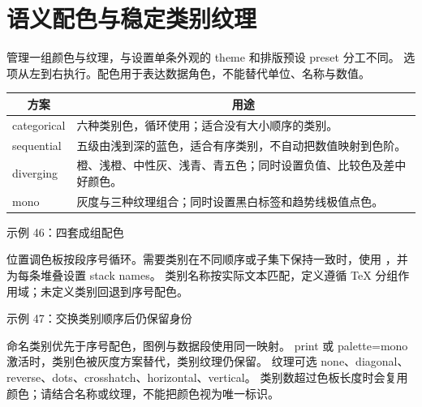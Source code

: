 \section{语义配色与稳定类别纹理}
 管理一组颜色与纹理，与设置单条外观的 theme 和排版预设 preset 分工不同。
选项从左到右执行。配色用于表达数据角色，不能替代单位、名称与数值。

\begin{tabularx}{\linewidth}{@{}lX@{}}
\toprule
\multicolumn{1}{c}{方案} & \multicolumn{1}{c}{用途}\\\midrule
categorical & 六种类别色，循环使用；适合没有大小顺序的类别。\\
sequential & 五级由浅到深的蓝色，适合有序类别，不自动把数值映射到色阶。\\
diverging & 橙、浅橙、中性灰、浅青、青五色；同时设置负值、比较色及差中好颜色。\\
mono & 灰度与三种纹理组合；同时设置黑白标签和趋势线极值点色。\\
\bottomrule
\end{tabularx}
\begin{example}[text and listing,sidebyside=false]{示例 46：四套成组配色}



\end{example}
位置调色板按段序号循环。需要类别在不同顺序或子集下保持一致时，使用
，并为每条堆叠设置 stack names。
类别名称按实际文本匹配，定义遵循 TeX 分组作用域；未定义类别回退到序号配色。
\begin{example}[text and listing,sidebyside=false]{示例 47：交换类别顺序后仍保留身份}


\end{example}
命名类别优先于序号配色，图例与数据段使用同一映射。
print 或 palette=mono 激活时，类别色被灰度方案替代，类别纹理仍保留。
纹理可选 none、diagonal、reverse、dots、crosshatch、horizontal、vertical。
类别数超过色板长度时会复用颜色；请结合名称或纹理，不能把颜色视为唯一标识。
